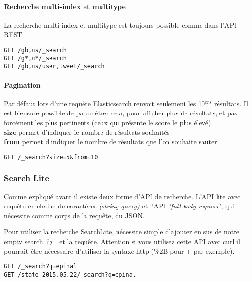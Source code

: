 \paragraph{Recherche multi-index et multitype}
La recherche multi-index et multitype est toujours possible comme dans l'API REST

\begin{lstlisting}[style=code,label={lst:APIsearchemptyexample4},caption={Une recherche multi-index ...}]
GET /gb,us/_search
GET /g*,u*/_search
GET /gb,us/user,tweet/_search
\end{lstlisting}

\paragraph{Pagination}
Par défaut lors d'une requête Elasticsearch renvoit seulement les 10$^{ers}$ résultats.
Il est biensure possible de paramétrer cela, pour afficher plus de résultats, et pas
forcément les plus pertinents (ceux qui présente le score le plus élevé).\\
\textbf{size} permet d'indiquer le nombre de résultats souhaités\\
\textbf{from} permet d'indiquer le nombre de résultats que l'on souhaite sauter.

\begin{lstlisting}[style=code,label={lst:APIsearchemptyexample4},caption={Pagination}]
GET /_search?size=5&from=10
\end{lstlisting}


\subsubsection{Search Lite}
Comme expliqué avant il existe deux forme d'API de recherche. L'API lite avec requête
en chaine de caractères \textit{(string query)} et l'API \textit{"full body request"},
qui nécessite comme corps de la requête, du JSON.

Pour utiliser la recherche SearchLite, nécessite simple d'ajouter en sus de notre
empty search \emph{?q=} et la requête. Attention si vous utilisez cette API avec 
curl il pourrait être nécessaire d'utiliser la syntaxe http (\%2B pour + par exemple).

\begin{lstlisting}[style=code,label={lst:APIsearchliteexample1},caption={Exemples simples}]
GET /_search?q=epinal
GET /state-2015.05.22/_search?q=epinal
\end{lstlisting}

